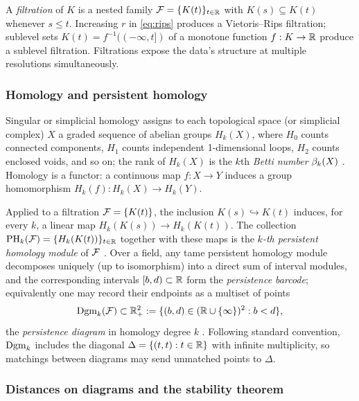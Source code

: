A \emph{filtration} of $K$ is a nested family
$\mathcal{F} = \{K(t)\}_{t \in \mathbb{R}}$ with $K(s) \subseteq K(t)$ whenever
$s \le t$. Increasing $r$ in \cref{eq:rips} produces a Vietoris--Rips
filtration; sublevel sets $K(t) = f^{-1}((-\infty,t])$ of a monotone
function $f : K \to \mathbb{R}$ produce a sublevel filtration. Filtrations
expose the data's structure at multiple resolutions simultaneously.

\subsubsection{Homology and persistent homology}

Singular or simplicial homology assigns to each topological space (or
simplicial complex) $X$ a graded sequence of abelian groups
$H_k(X)$, where $H_0$ counts connected components, $H_1$ counts independent
1-dimensional loops, $H_2$ counts enclosed voids, and so on; the rank of
$H_k(X)$ is the $k$th \emph{Betti number} $\beta_k(X)$
\citep{hatcher2002algebraic,munkres1984elements}. Homology is a functor: a
continuous map $f : X \to Y$ induces a group homomorphism
$H_k(f) : H_k(X) \to H_k(Y)$.

Applied to a filtration $\mathcal{F} = \{K(t)\}$, the inclusion
$K(s) \hookrightarrow K(t)$ induces, for every $k$, a linear map
$H_k(K(s)) \to H_k(K(t))$. The collection
$\mathrm{PH}_{k}(\mathcal{F}) = \{H_k(K(t))\}_{t \in \mathbb{R}}$ together with these maps is the
\emph{$k$-th persistent homology module} of $\mathcal{F}$
\citep{edelsbrunner2002topological,zomorodian2005computing,
edelsbrunner2008persistent}. Over a field, any tame persistent homology
module decomposes uniquely (up to isomorphism) into a direct sum of interval
modules, and the corresponding intervals $[b,d) \subset \mathbb{R}$ form the
\emph{persistence barcode}; equivalently one may record their endpoints as
a multiset of points
\begin{equation}
  \mathrm{Dgm}_k(\mathcal{F}) \subset \mathbb{R}^2_+ := \{ (b,d) \in (\mathbb{R} \cup \{\infty\})^2 : b < d \},
  \label{eq:dgm}
\end{equation}
the \emph{persistence diagram} in homology degree $k$
\citep{ghrist2008barcodes,edelsbrunner2010computational}. Following standard
convention, $\mathrm{Dgm}_k$ includes the diagonal $\Delta = \{(t,t) : t \in \mathbb{R}\}$
with infinite multiplicity, so matchings between diagrams may send unmatched
points to $\Delta$.

\subsubsection{Distances on diagrams and the stability theorem}

